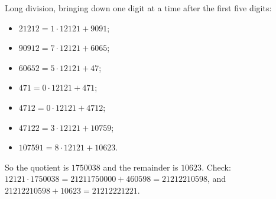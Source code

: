 Long division, bringing down one digit at a time after the first five digits:
\begin{itemize}
\item $21212=1\cdot12121+9091$;
\item $90912=7\cdot12121+6065$;
\item $60652=5\cdot12121+47$;
\item $471=0\cdot12121+471$;
\item $4712=0\cdot12121+4712$;
\item $47122=3\cdot12121+10759$;
\item $107591=8\cdot12121+10623$.
\end{itemize}
So the quotient is $\boxed{1750038}$ and the remainder is $\boxed{10623}$. Check: $12121\cdot1750038=21211750000+460598=21212210598$, and $21212210598+10623=21212221221$.
